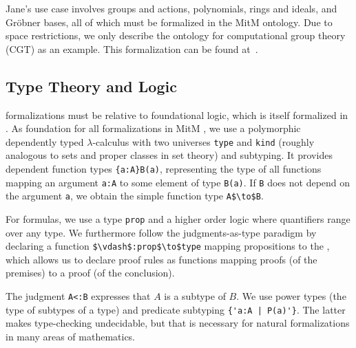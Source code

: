 Jane's use case involves groups and actions, polynomials, rings and ideals, and Gröbner bases, all of which must be formalized in the MitM ontology.
Due to space restrictions, we only describe the ontology for computational group theory (CGT) as an example.
This formalization can be found at~\cite{mitm:groups:on}.

\subsection{Type Theory and Logic}

\OMMT formalizations must be relative to foundational logic, which is itself formalized in \OMMT.
As foundation for all formalizations in MitM \cite{mitm:foundation:on}, we use a polymorphic dependently typed $\lambda$-calculus with two universes \lstinline|type| and \lstinline|kind| (roughly analogous to sets and proper classes in set theory) and subtyping.
It provides dependent function types \lstinline|{a:A}B(a)|, representing the type of all functions mapping an argument \lstinline|a:A| to some element of type \lstinline|B(a)|. If \lstinline|B| does not depend on the argument \lstinline|a|, we obtain the simple function type \lstinline[mathescape]|A$\to$B|.

For formulas, we use a type \lstinline|prop| and a higher order logic where quantifiers range over any type.
We furthermore follow the judgments-as-type paradigm by declaring a function \lstinline[mathescape]|$\vdash$:prop$\to$type| mapping propositions to the , which allows us to declare proof rules as functions mapping proofs (of the premises) to a proof (of the conclusion).

The judgment \lstinline|A<:B| expresses that $A$ is a subtype of $B$.
We use power types (the type of subtypes of a type) and predicate subtyping \lstinline?{'a:A | P(a)'}?.
The latter makes type-checking undecidable, but that is necessary for natural formalizations in many areas of mathematics.

